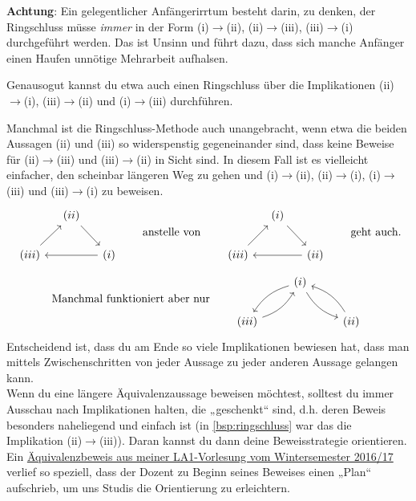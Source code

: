 \begin{bem}
    \textbf{Achtung}: Ein gelegentlicher Anfängerirrtum besteht darin, zu denken, der Ringschluss müsse \emph{immer} in der Form (i)$\to$(ii), (ii)$\to$(iii), (iii)$\to$(i) durchgeführt werden. Das ist Unsinn und führt dazu, dass sich manche Anfänger einen Haufen unnötige Mehrarbeit aufhalsen.
    
    Genausogut kannst du etwa auch einen Ringschluss über die Implikationen (ii)$\to$(i), (iii)$\to$(ii) und (i)$\to$(iii) durchführen.
    
    Manchmal ist die Ringschluss-Methode auch unangebracht, wenn etwa die beiden Aussagen (ii) und (iii) so widerspenstig gegeneinander sind, dass keine Beweise für (ii)$\to$(iii) und (iii)$\to$(ii) in Sicht sind. In diesem Fall ist es vielleicht einfacher, den scheinbar längeren Weg zu gehen und (i)$\to$(ii), (ii)$\to$(i), (i)$\to$(iii) und (iii)$\to$(i) zu beweisen.
    \[\begin{tikzcd}[column sep=small]
        & (ii) \ar[rd] & \\
        (iii)\ar[ru] && (i)\ar[ll]
    \end{tikzcd}\qquad\text{anstelle von}\qquad\begin{tikzcd}[column sep=small]
        & (i) \ar[rd] & \\
        (iii)\ar[ru] && (ii)\ar[ll]    
    \end{tikzcd}\qquad\text{geht auch.}\]
    \[\text{Manchmal funktioniert aber nur}\qquad \begin{tikzcd}
        & (i) \ar[ld, bend right=20]  \ar[rd, bend right=20] & \\
        (iii)\ar[ru, bend right=20] && (ii) \ar[lu, bend right=20]
    \end{tikzcd}\]
    Entscheidend ist, dass du am Ende so viele Implikationen bewiesen hat, dass man mittels Zwischenschritten von jeder Aussage zu jeder anderen Aussage gelangen kann. \\[0.5em]
    Wenn du eine längere Äquivalenzaussage beweisen möchtest, solltest du immer Ausschau nach Implikationen halten, die „geschenkt“ sind, d.h. deren Beweis besonders naheliegend und einfach ist (in \cref{bsp:ringschluss} war das die Implikation (ii)$\to$(iii)). Daran kannst du dann deine Beweisstrategie orientieren. Ein \href{https://mampf.mathi.uni-heidelberg.de/media/105/play?time=2609}{Äquivalenzbeweis aus meiner LA1-Vorlesung vom Wintersemester 2016/17} verlief so speziell, dass der Dozent zu Beginn seines Beweises einen „Plan“ aufschrieb, um uns Studis die Orientierung zu erleichtern.

\end{bem}
